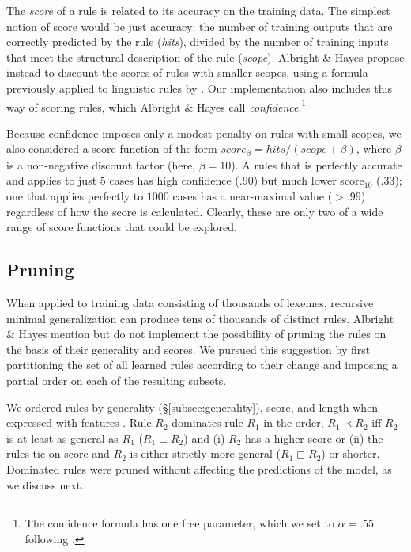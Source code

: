 \documentclass[11pt]{article}
\begin{document}
The \emph{score} of a rule is related to its accuracy on the training data. The simplest notion of score would be just accuracy: the number of training outputs that are correctly predicted by the rule (\emph{hits}), divided by the number of training inputs that meet the structural description of the rule (\emph{scope}). Albright \& Hayes propose instead to discount the scores of rules with smaller scopes, using a formula previously applied to linguistic rules by \citet{mikheev-1997-automatic}. Our implementation also includes this way of scoring rules, which Albright \& Hayes call \textit{confidence}.\footnote{The confidence formula has one free parameter, which we set to $\alpha = .55$ following \citet[][p. 127]{albright2003}.}

Because confidence imposes only a modest penalty on rules with small scopes, we also considered a score function of the form $score_{\beta} = hits / (scope + \beta)$, where $\beta$ is a non-negative discount factor (here, $\beta = 10$). A rules that is perfectly accurate and applies to just $5$ cases has high confidence ($.90$) but much lower score$_{10}$ ($.33$); one that applies perfectly to $1000$ cases has a near-maximal value ($> .99$) regardless of how the score is calculated. Clearly, these are only two of a wide range of score functions that could be explored.

\subsection{Pruning}
\label{subsec:pruning}

When applied to training data consisting of thousands of lexemes, recursive minimal generalization can produce tens of thousands of distinct rules. Albright \& Hayes mention but do not implement the possibility of pruning the rules on the basis of their generality and scores. We pursued this suggestion by first partitioning the set of all learned rules according to their change and imposing a partial order on each of the resulting subsets.

We ordered rules by generality (\S\ref{subsec:generality}), score, and length when expressed with features \citep{chomsky1968a}. Rule $R_2$ dominates rule $R_1$ in the order, $R_1 \prec R_2$ iff $R_2$ is at least as general as $R_1$ ($R_1 \sqsubseteq R_2$) and (i) $R_2$ has a higher score or (ii) the rules tie on score and $R_2$ is either strictly more general ($R_1 \sqsubset R_2$) or shorter. Dominated rules were pruned without affecting the predictions of the model, as we discuss next.
\end{document}
